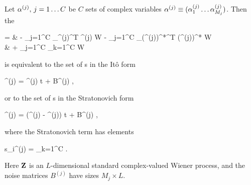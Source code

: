 \begin{theorem}
\label{thm:fpe-sde:corr:mc-fpe-sde}
	Let $\mathbf{\alpha}^{(j)},\, j = 1 \ldots C$ be $C$ sets of complex variables $\mathbf{\alpha}^{(j)} \equiv (\alpha_1^{(j)} \ldots \alpha_{M_j}^{(j)})$.
	Then the 
	\begin{eqn*}
		={} & - \sum_{j=1}^C \vcwd_{\balpha^{(j)}}^T \avec^{(j)} W
		- \sum_{j=1}^C \vcwd_{(\balpha^{(j)})^*}^T (\avec^{(j)})^* W \\
		& + \sum_{j=1}^C \sum_{k=1}^C
			 W
	\end{eqn*}
	is equivalent to the set of s in the It\^o form
	\begin{eqn*}
		\upd\balpha^{(j)} = \avec^{(j)} \upd t + B^{(j)} \upd\Zvec,
	\end{eqn*}
	or to the set of s in the Stratonovich form
	\begin{eqn*}
		\upd\balpha^{(j)} = (\avec^{(j)} - \svec^{(j)}) \upd t + B^{(j)} \upd\Zvec,
	\end{eqn*}
	where the Stratonovich term has elements
	\begin{eqn*}
		s_i^{(j)} =  \sum_{k=1}^C
			\Trace{ (B^{(k)})^H \vcwd_{(\balpha^{(k)})^*} \evec_i^T B^{(j)} }.
	\end{eqn*}
	Here $\mathbf{Z}$ is an $L$-dimensional standard complex-valued Wiener process, and the noise matrices $B^{(j)}$ have sizes $M_j \times L$.
\end{theorem}
